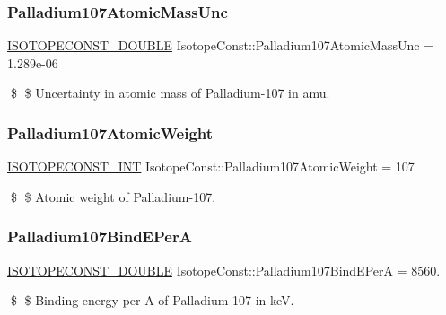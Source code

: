 \subsubsection{\texorpdfstring{Palladium107\+Atomic\+Mass\+Unc}{Palladium107AtomicMassUnc}}
{\footnotesize\ttfamily \mbox{\hyperlink{group___isotope_const-_macros_ga8f45a7272ce02c0b4c65c44636ed719a}{I\+S\+O\+T\+O\+P\+E\+C\+O\+N\+S\+T\+\_\+\+D\+O\+U\+B\+LE}} Isotope\+Const\+::\+Palladium107\+Atomic\+Mass\+Unc = 1.\+289e-\/06}

\$ \$ Uncertainty in atomic mass of Palladium-\/107 in amu. \mbox{\label{group___isotope_const-_palladium-_pd107_ga4927937c4a412dcffb5ecd67699333f0}} 
\subsubsection{\texorpdfstring{Palladium107\+Atomic\+Weight}{Palladium107AtomicWeight}}
{\footnotesize\ttfamily \mbox{\hyperlink{group___isotope_const-_macros_ga5f18360b3e99483a35c32d789e62621c}{I\+S\+O\+T\+O\+P\+E\+C\+O\+N\+S\+T\+\_\+\+I\+NT}} Isotope\+Const\+::\+Palladium107\+Atomic\+Weight = 107}

\$ \$ Atomic weight of Palladium-\/107. \mbox{\label{group___isotope_const-_palladium-_pd107_gac4e80b299174791091d7e76ed8dc446c}} 
\subsubsection{\texorpdfstring{Palladium107\+Bind\+E\+PerA}{Palladium107BindEPerA}}
{\footnotesize\ttfamily \mbox{\hyperlink{group___isotope_const-_macros_ga8f45a7272ce02c0b4c65c44636ed719a}{I\+S\+O\+T\+O\+P\+E\+C\+O\+N\+S\+T\+\_\+\+D\+O\+U\+B\+LE}} Isotope\+Const\+::\+Palladium107\+Bind\+E\+PerA = 8560.}

\$ \$ Binding energy per A of Palladium-\/107 in keV. \mbox{\label{group___isotope_const-_palladium-_pd107_gac338fe8d03409168a4359b4ca9690f3a}} 

